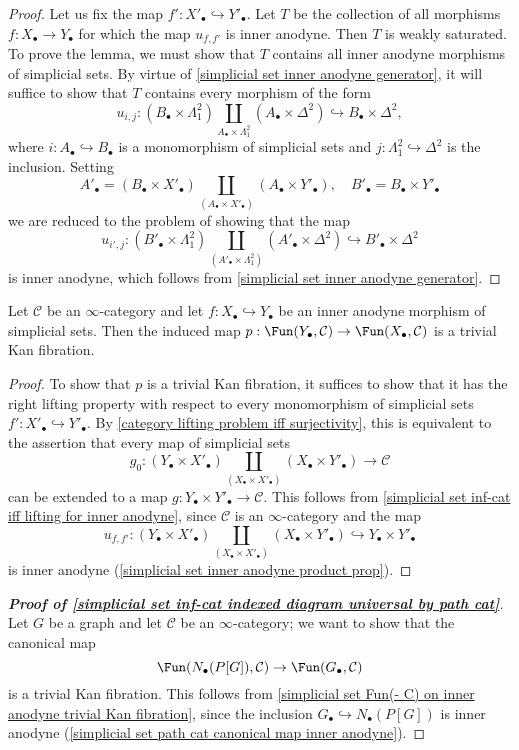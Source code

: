 \begin{proof}
Let us fix the map $f':X'_\bullet\hookrightarrow Y'_\bullet$. Let $T$ be the collection of all morphisms $f:X_\bullet\to Y_\bullet$ for which the map $u_{f,f'}$ is inner anodyne. Then $T$ is weakly saturated. To prove the lemma, we must show that $T$ contains all inner anodyne morphisms of simplicial sets. By virtue of \cref{simplicial set inner anodyne generator}, it will suffice to show that $T$ contains every morphism of the form
\[u_{i,j}:(B_\bullet\times\Lambda^2_1)\coprod_{A_\bullet\times\Lambda^2_1}(A_\bullet\times\Delta^2)\hookrightarrow B_\bullet\times\Delta^2,\]
where $i:A_\bullet\hookrightarrow B_\bullet$ is a monomorphism of simplicial sets and $j:\Lambda^2_1\hookrightarrow\Delta^2$ is the inclusion. Setting
\[A'_\bullet=(B_\bullet\times X'_\bullet)\coprod_{(A_\bullet\times X'_\bullet)}(A_\bullet\times Y'_\bullet),\quad B'_\bullet=B_\bullet\times Y'_\bullet\]
we are reduced to the problem of showing that the map
\[u_{i',j}:(B'_\bullet\times\Lambda^2_1)\coprod_{(A'_\bullet\times\Lambda^2_1)}(A'_\bullet\times\Delta^2)\hookrightarrow B'_\bullet\times\Delta^2\]
is inner anodyne, which follows from \cref{simplicial set inner anodyne generator}.
\end{proof}
\begin{proposition}\label{simplicial set Fun(- C) on inner anodyne trivial Kan fibration}
Let $\mathcal{C}$ be an $\infty$-category and let $f:X_\bullet\hookrightarrow Y_\bullet$ be an inner anodyne morphism of simplicial sets. Then the induced map $p:\Fun(Y_\bullet,\mathcal{C})\to\Fun(X_\bullet,\mathcal{C})$ is a trivial Kan fibration.
\end{proposition}
\begin{proof}
To show that $p$ is a trivial Kan fibration, it suffices to show that it has the right lifting property with respect to every monomorphism of simplicial sets $f':X'_\bullet\hookrightarrow Y'_\bullet$. By \cref{category lifting problem iff surjectivity}, this is equivalent to the assertion that every map of simplicial sets
\[g_0:(Y_\bullet\times X'_\bullet)\coprod_{(X_\bullet\times X'_\bullet)}(X_\bullet\times Y'_\bullet)\to\mathcal{C}\]
can be extended to a map $g:Y_\bullet\times Y'_\bullet\to\mathcal{C}$. This follows from \cref{simplicial set inf-cat iff lifting for inner anodyne}, since $\mathcal{C}$ is an $\infty$-category and the map
\[u_{f,f'}:(Y_\bullet\times X'_\bullet)\coprod_{(X_\bullet\times X'_\bullet)}(X_\bullet\times Y'_\bullet)\hookrightarrow Y_\bullet\times Y'_\bullet\]
is inner anodyne (\cref{simplicial set inner anodyne product prop}).
\end{proof}
\begin{proof}[\textbf{Proof of \cref{simplicial set inf-cat indexed diagram universal by path cat}}]
Let $G$ be a graph and let $\mathcal{C}$ be an $\infty$-category; we want to show that the canonical map
\[\Fun(N_\bullet(P[G]),\mathcal{C})\to\Fun(G_\bullet,\mathcal{C})\]
is a trivial Kan fibration. This follows from \cref{simplicial set Fun(- C) on inner anodyne trivial Kan fibration}, since the inclusion $G_\bullet\hookrightarrow N_\bullet(P[G])$ is inner anodyne (\cref{simplicial set path cat canonical map inner anodyne}).
\end{proof}
